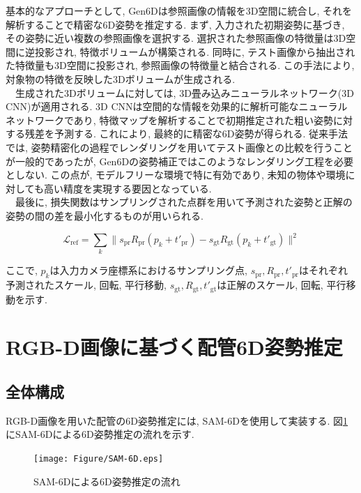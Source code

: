 基本的なアプローチとして, Gen6Dは参照画像の情報を3D空間に統合し, それを解析することで精密な6D姿勢を推定する. 
まず, 入力された初期姿勢に基づき, その姿勢に近い複数の参照画像を選択する. 
選択された参照画像の特徴量は3D空間に逆投影され, 特徴ボリュームが構築される. 
同時に, テスト画像から抽出された特徴量も3D空間に投影され, 参照画像の特徴量と結合される. 
この手法により, 対象物の特徴を反映した3Dボリュームが生成される. \\
　生成された3Dボリュームに対しては, 3D畳み込みニューラルネットワーク(3D CNN)が適用される. 
3D CNNは空間的な情報を効果的に解析可能なニューラルネットワークであり, 特徴マップを解析することで初期推定された粗い姿勢に対する残差を予測する. 
これにより, 最終的に精密な6D姿勢が得られる. 
従来手法では, 姿勢精密化の過程でレンダリングを用いてテスト画像との比較を行うことが一般的であったが, Gen6Dの姿勢補正ではこのようなレンダリング工程を必要としない. 
この点が, モデルフリーな環境で特に有効であり, 未知の物体や環境に対しても高い精度を実現する要因となっている. \\
　最後に, 損失関数はサンプリングされた点群を用いて予測された姿勢と正解の姿勢の間の差を最小化するものが用いられる. 

\begin{equation}
\mathcal{L}_{\text{ref}} = \sum_{k} \|s_{\text{pr}} R_{\text{pr}} (p_k + t'_{\text{pr}}) - s_{\text{gt}} R_{\text{gt}} (p_k + t'_{\text{gt}})\|^2
\tag{2.3}
\end{equation}

ここで, \(p_k\)は入力カメラ座標系におけるサンプリング点, \(s_{\text{pr}}, R_{\text{pr}}, t'_{\text{pr}}\)はそれぞれ予測されたスケール, 回転, 平行移動, \(s_{\text{gt}}, R_{\text{gt}}, t'_{\text{gt}}\)は正解のスケール, 回転, 平行移動を示す. 


\section{RGB-D画像に基づく配管6D姿勢推定}
\subsection{全体構成}
RGB-D画像を用いた配管の6D姿勢推定には, SAM-6Dを使用して実装する. 
図\ref{fig:2-f7}にSAM-6Dによる6D姿勢推定の流れを示す. 
\begin{figure}[htbt]
	\centering
	 \texttt{[image: Figure/SAM-6D.eps]}
	 \caption{SAM-6Dによる6D姿勢推定の流れ}
	 \label{fig:2-f7}
\end{figure}

